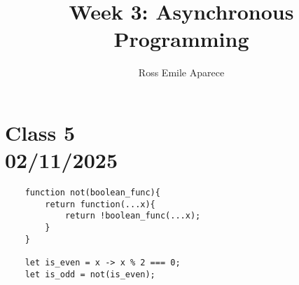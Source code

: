 \documentclass{article}
\title{Week 3: Asynchronous Programming}
\date{}
\author{Ross Emile Aparece}
\begin{document}
\maketitle

\section*{Class 5 \\ 02/11/2025}\label{sec:Class 5}
\begin{lstlisting}
    function not(boolean_func){
        return function(...x){
            return !boolean_func(...x);
        }
    }

    let is_even = x -> x % 2 === 0;
    let is_odd = not(is_even);
\end{lstlisting}
\end{document}
